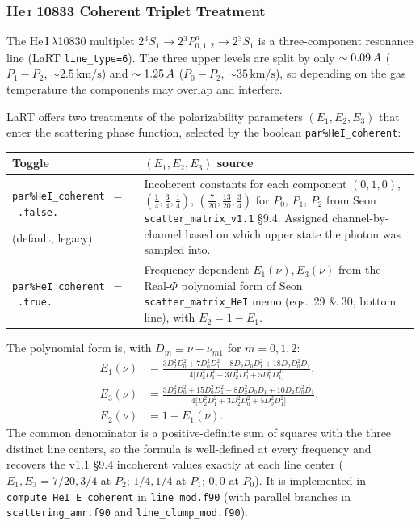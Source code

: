 \documentclass[english,a4paper]{my_memo}
\newcommand{\parm}[1]{\texttt{par\%#1}}
\newcommand{\ion}[2]{#1\,{\scriptsize #2}}
\begin{document}
\subsubsection{\texorpdfstring{He\,\textsc{i}}{He I} 10833 Coherent Triplet Treatment}
\label{sec:HeI_coherent}

The \ion{He}{I}\,$\lambda$10830 multiplet
$2{}^{3}S_{1}\rightarrow 2{}^{3}P^{o}_{0,1,2}\rightarrow 2{}^{3}S_{1}$ is a
three-component resonance line (LaRT \texttt{line\_type=6}). The three upper
levels are split by only $\sim 0.09\,\AA$ ($P_{1}{-}P_{2}$,
$\sim 2.5\,\mathrm{km/s}$) and $\sim 1.25\,\AA$ ($P_{0}{-}P_{2}$,
$\sim 35\,\mathrm{km/s}$), so depending on the gas temperature the components
may overlap and interfere.

LaRT offers two treatments of the polarizability parameters
$(E_{1}, E_{2}, E_{3})$ that enter the scattering phase function, selected by
the boolean \parm{HeI\_coherent}:

\begin{center}
\begin{tabular}{L{4.8cm}L{9.0cm}}
\toprule
Toggle & $(E_{1}, E_{2}, E_{3})$ source \\
\midrule
\parm{HeI\_coherent}~$=$~\texttt{.false.}\par(default, legacy) &
Incoherent constants for each component
$(0,1,0)$, $(\tfrac14,\tfrac34,\tfrac14)$, $(\tfrac{7}{20},\tfrac{13}{20},\tfrac{3}{4})$ for $P_{0}$, $P_{1}$, $P_{2}$ from
Seon \texttt{scatter\_matrix\_v1.1} \S 9.4. Assigned channel-by-channel
based on which upper state the photon was sampled into. \\
\parm{HeI\_coherent}~$=$~\texttt{.true.} &
Frequency-dependent $E_{1}(\nu), E_{3}(\nu)$ from the Real-$\Phi$ polynomial
form of Seon \texttt{scatter\_matrix\_HeI} memo (eqs.~29 \& 30, bottom
line), with $E_{2} = 1 - E_{1}$. \\
\bottomrule
\end{tabular}
\end{center}

The polynomial form is, with $D_{m} \equiv \nu - \nu_{m1}$ for $m=0,1,2$:
\begin{align}
  E_{1}(\nu) &= \frac{3 D_{2}^{2}D_{0}^{2} + 7 D_{0}^{2}D_{1}^{2} + 8 D_{2}D_{0}D_{1}^{2} + 18 D_{2}D_{0}^{2}D_{1}}
                    {4\bigl[D_{2}^{2}D_{1}^{2} + 3 D_{2}^{2}D_{0}^{2} + 5 D_{0}^{2}D_{1}^{2}\bigr]}, \\
  E_{3}(\nu) &= \frac{3 D_{2}^{2}D_{0}^{2} + 15 D_{0}^{2}D_{1}^{2} + 8 D_{2}^{2}D_{0}D_{1} + 10 D_{2}D_{0}^{2}D_{1}}
                    {4\bigl[D_{2}^{2}D_{1}^{2} + 3 D_{2}^{2}D_{0}^{2} + 5 D_{0}^{2}D_{1}^{2}\bigr]}, \\
  E_{2}(\nu) &= 1 - E_{1}(\nu).
\end{align}
The common denominator is a positive-definite sum of squares with the three
distinct line centers, so the formula is well-defined at every frequency and
recovers the v1.1 \S 9.4 incoherent values exactly at each line center
($E_{1}, E_{3} = 7/20, 3/4$ at $P_{2}$; $1/4, 1/4$ at $P_{1}$; $0, 0$ at
$P_{0}$). It is implemented in \texttt{compute\_HeI\_E\_coherent} in
\texttt{line\_mod.f90} (with parallel branches in
\texttt{scattering\_amr.f90} and \texttt{line\_clump\_mod.f90}).
\end{document}
